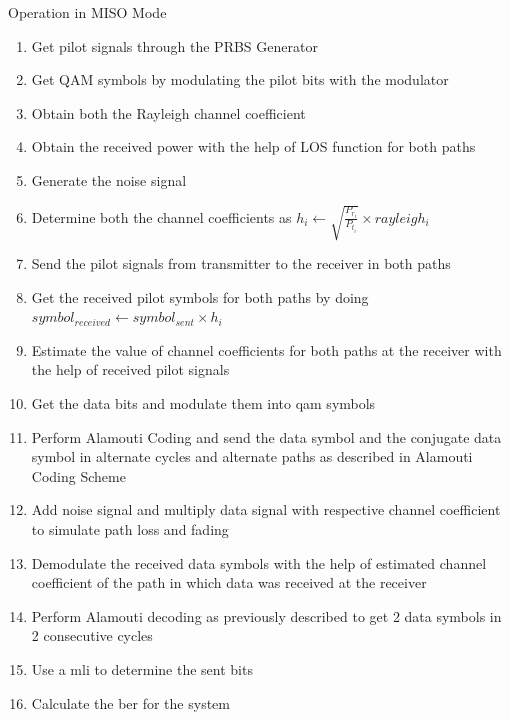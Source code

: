 \begin{algorithm}[!htbp]
\caption{Operation in MISO Mode}
\label{alg:Operation in MISO Mode}
\begin{enumerate}
\item Get pilot signals through the PRBS Generator
\item Get QAM symbols by modulating the pilot bits with the modulator
\item Obtain both the Rayleigh channel coefficient
\item Obtain the received power with the help of LOS function for both paths
\item Generate the noise signal
\item Determine both the channel coefficients as $h_i \gets \sqrt{\frac{P_{r_i}}{P_{t_i}}} \times rayleigh_i$
\item Send the pilot signals from transmitter to the receiver in both paths
\item Get the received pilot symbols for both paths by doing $symbol_{received} \gets symbol_{sent} \times h_i$
\item Estimate the value of channel coefficients for both paths at the receiver with the help of received pilot signals
\item Get the data bits and modulate them into \acrshort{qam} symbols
\item Perform Alamouti Coding and send the data symbol and the conjugate data symbol in alternate cycles and alternate paths as described in Alamouti Coding Scheme
\item Add noise signal and multiply data signal with respective channel coefficient to simulate path loss and fading
\item Demodulate the received data symbols with the help of estimated channel coefficient of the path in which data was received at the receiver
\item Perform Alamouti decoding as previously described to get 2 data symbols in 2 consecutive cycles
\item Use a \acrlong{mli} to determine the sent bits
\item Calculate the \acrshort{ber} for the system
\end{enumerate}
\end{algorithm} 


